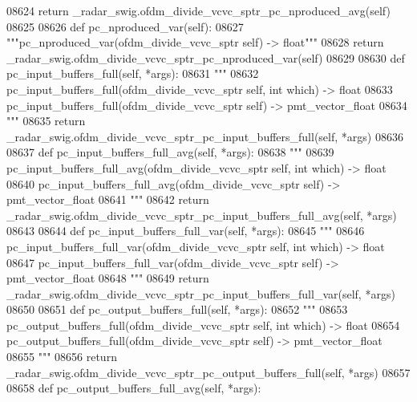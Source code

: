 \begin{DoxyCode}
{{{{{{{{{{{{{{{{{{{{{{{{{{{{08624         \textcolor{keywordflow}{return} \_radar\_swig.ofdm\_divide\_vcvc\_sptr\_pc\_nproduced\_avg(self)
08625 
08626     \textcolor{keyword}{def }pc_nproduced_var(self):
08627         \textcolor{stringliteral}{"""pc\_nproduced\_var(ofdm\_divide\_vcvc\_sptr self) -> float"""}
08628         \textcolor{keywordflow}{return} \_radar\_swig.ofdm\_divide\_vcvc\_sptr\_pc\_nproduced\_var(self)
08629 
08630     \textcolor{keyword}{def }pc_input_buffers_full(self, *args):
08631         \textcolor{stringliteral}{"""}
08632 \textcolor{stringliteral}{        pc\_input\_buffers\_full(ofdm\_divide\_vcvc\_sptr self, int which) -> float}
08633 \textcolor{stringliteral}{        pc\_input\_buffers\_full(ofdm\_divide\_vcvc\_sptr self) -> pmt\_vector\_float}
08634 \textcolor{stringliteral}{        """}
08635         \textcolor{keywordflow}{return} \_radar\_swig.ofdm\_divide\_vcvc\_sptr\_pc\_input\_buffers\_full(self, *args)
08636 
08637     \textcolor{keyword}{def }pc_input_buffers_full_avg(self, *args):
08638         \textcolor{stringliteral}{"""}
08639 \textcolor{stringliteral}{        pc\_input\_buffers\_full\_avg(ofdm\_divide\_vcvc\_sptr self, int which) -> float}
08640 \textcolor{stringliteral}{        pc\_input\_buffers\_full\_avg(ofdm\_divide\_vcvc\_sptr self) -> pmt\_vector\_float}
08641 \textcolor{stringliteral}{        """}
08642         \textcolor{keywordflow}{return} \_radar\_swig.ofdm\_divide\_vcvc\_sptr\_pc\_input\_buffers\_full\_avg(self, *args)
08643 
08644     \textcolor{keyword}{def }pc_input_buffers_full_var(self, *args):
08645         \textcolor{stringliteral}{"""}
08646 \textcolor{stringliteral}{        pc\_input\_buffers\_full\_var(ofdm\_divide\_vcvc\_sptr self, int which) -> float}
08647 \textcolor{stringliteral}{        pc\_input\_buffers\_full\_var(ofdm\_divide\_vcvc\_sptr self) -> pmt\_vector\_float}
08648 \textcolor{stringliteral}{        """}
08649         \textcolor{keywordflow}{return} \_radar\_swig.ofdm\_divide\_vcvc\_sptr\_pc\_input\_buffers\_full\_var(self, *args)
08650 
08651     \textcolor{keyword}{def }pc_output_buffers_full(self, *args):
08652         \textcolor{stringliteral}{"""}
08653 \textcolor{stringliteral}{        pc\_output\_buffers\_full(ofdm\_divide\_vcvc\_sptr self, int which) -> float}
08654 \textcolor{stringliteral}{        pc\_output\_buffers\_full(ofdm\_divide\_vcvc\_sptr self) -> pmt\_vector\_float}
08655 \textcolor{stringliteral}{        """}
08656         \textcolor{keywordflow}{return} \_radar\_swig.ofdm\_divide\_vcvc\_sptr\_pc\_output\_buffers\_full(self, *args)
08657 
08658     \textcolor{keyword}{def }pc_output_buffers_full_avg(self, *args):
}}}}}}}}}}}}}}}}}}}}}}}}}}}}
\end{DoxyCode}
